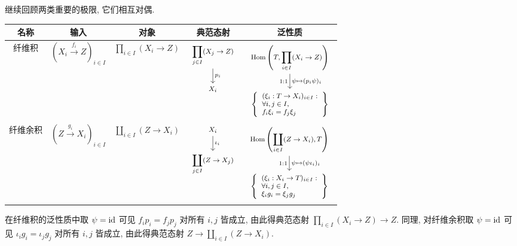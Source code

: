 继续回顾两类重要的极限, 它们相互对偶.
\begin{center}\small\begin{tabular}{|c|c|c|c|c|} \hline
	名称 & 输入 & 对象 & 典范态射 & 泛性质 \\ \hline
	纤维积 & $\left( X_i \xrightarrow{f_i} Z \right)_{i \in I}$ & $\displaystyle\prod_{i \in I} (X_i \to Z)$ & $\begin{tikzcd}[every cell/.append style={font = \footnotesize}] \displaystyle\prod_{j \in I} (X_j \to Z) \arrow[d, "p_i"] \\ X_i \end{tikzcd}$ & $\begin{tikzcd}[every cell/.append style={font = \footnotesize}]
		\Hom\left(T, \displaystyle\prod_{i \in I} (X_i \to Z) \right) \arrow[d, "1:1"', "{\psi \mapsto (p_i \psi)_i}"] \\
		\left\{\begin{array}{l} (\xi_i: T \to X_i)_{i \in I}: \\ \forall i,j \in I, \\ f_i \xi_i = f_j \xi_j \end{array}\right\}
	\end{tikzcd}$ \\
	纤维余积 & $\left( Z \xrightarrow{g_i} X_i \right)_{i \in I}$ & $\displaystyle\coprod_{i \in I} (Z \to X_i)$ & $\begin{tikzcd}[every cell/.append style={font = \footnotesize}] X_i \arrow[d, "\iota_i"] \\ \displaystyle\coprod_{j \in I} (Z \to X_j) \end{tikzcd}$ & $\begin{tikzcd}[every cell/.append style={font = \footnotesize}]
		\Hom\left(\displaystyle\coprod_{i \in I} (Z \to X_i), T \right) \arrow[d, "1:1"', "{\psi \mapsto (\psi \iota_i)_i}"] \\
		\left\{\begin{array}{l} (\xi_i: X_i \to T)_{i \in I}: \\ \forall i,j \in I, \\ \xi_i g_i = \xi_j g_j \end{array}\right\}
	\end{tikzcd}$ \\ \hline
\end{tabular}\end{center}

在纤维积的泛性质中取 $\psi = \mathrm{id}$ 可见 $f_i p_i = f_j p_j$ 对所有 $i,j$ 皆成立, 由此得典范态射 $\prod_{i \in I} (X_i \to Z) \to Z$. 同理, 对纤维余积取 $\psi = \mathrm{id}$ 可见 $\iota_i g_i = \iota_j g_j$ 对所有 $i,j$ 皆成立, 由此得典范态射 $Z \to \coprod_{i \in I} (Z \to X_i)$.

